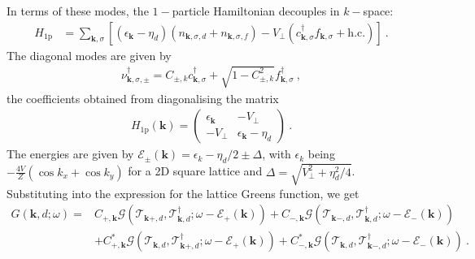 In terms of these modes, the \(1-\)particle Hamiltonian decouples in \(k-\)space:
\begin{equation}\begin{aligned}
	H_\text{1p} &= \sum_{\bm k,\sigma}\left[(\epsilon_{\bm k} - \eta_d) (n_{\bm k,\sigma, d} + n_{\bm k,\sigma, f}) - V_\perp(c^\dagger_{\bm k,\sigma}f_{\bm k,\sigma} + \text{h.c.})\right]~.
\end{aligned}\end{equation}
The diagonal modes are given by
\begin{equation}\begin{aligned}
	\nu^\dagger_{\bm k,\sigma,\pm} = C_{\pm,k} c^\dagger_{\bm k,\sigma} + \sqrt{1 - C_{\pm,k}^2}f^\dagger_{\bm k,\sigma}~,
\end{aligned}\end{equation}
the coefficients obtained from diagonalising the matrix
\begin{equation}\begin{aligned}
	H_\text{1p}(\bm k) = \begin{pmatrix} \epsilon_{\bm k}  & -V_\perp\\ -V_\perp & \epsilon_{\bm k} - \eta_d \end{pmatrix}~.
\end{aligned}\end{equation}
The energies are given by \(\mathcal{E}_\pm(\bm k) = \epsilon_k -\eta_d/2 \pm \Delta\), with \(\epsilon_k\) being \(-\frac{4V}{Z}(\cos k_x + \cos k_y)\) for a 2D square lattice and \(\Delta = \sqrt{V_\perp^2 + \eta_d^2/4}\).
Substituting into the expression for the lattice Greens function, we get
\begin{equation}\begin{aligned}
	G(\bm k,d;\omega) =& C_{+, \bm k}\mathcal{G}(\mathcal{T}_{\bm k+,d}, \mathcal{T}^\dagger_{\bm k,d}; \omega - \mathcal{E}_+(\bm k)) + C_{-, \bm k}\mathcal{G}(\mathcal{T}_{\bm k-,d}, \mathcal{T}^\dagger_{\bm k,d}; \omega - \mathcal{E}_-(\bm k))\\
					   &+ C^*_{+, \bm k}\mathcal{G}(\mathcal{T}_{\bm k,d}, \mathcal{T}^\dagger_{\bm k+,d}; \omega - \mathcal{E}_+(\bm k)) + C^*_{-, \bm k}\mathcal{G}(\mathcal{T}_{\bm k,d}, \mathcal{T}^\dagger_{\bm k-,d}; \omega - \mathcal{E}_-(\bm k))	~.
\end{aligned}\end{equation}

